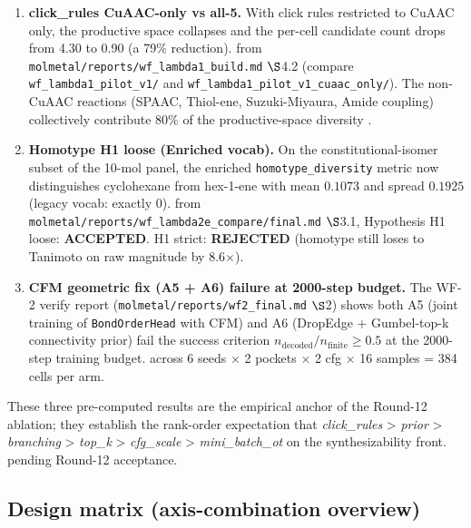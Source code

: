 \begin{enumerate}
  \item \textbf{click\_rules CuAAC-only vs all-5.}
        With click rules restricted to CuAAC only, the productive
        space collapses and the per-cell candidate count drops
        from 4.30 to 0.90 (a 79\% reduction).
        \MEASURED{} from
        \texttt{molmetal/reports/wf\_lambda1\_build.md} $\S$4.2
        (compare \texttt{wf\_lambda1\_pilot\_v1/} and
        \texttt{wf\_lambda1\_pilot\_v1\_cuaac\_only/}).  The
        non-CuAAC reactions (SPAAC, Thiol-ene, Suzuki-Miyaura,
        Amide coupling) collectively contribute 80\% of the
        productive-space diversity \MEASURED{}.

  \item \textbf{Homotype H1 loose (Enriched vocab).}
        On the constitutional-isomer subset of the 10-mol panel,
        the enriched \texttt{homotype\_diversity} metric now
        distinguishes cyclohexane from hex-1-ene with mean
        $0.1073$ and spread $0.1925$ (legacy vocab: exactly 0).
        \MEASURED{} from
        \texttt{molmetal/reports/wf\_lambda2e\_compare/final.md}
        $\S$3.1, Hypothesis H1 loose: \textbf{ACCEPTED}.
        H1 strict: \textbf{REJECTED} (homotype still loses to
        Tanimoto on raw magnitude by 8.6$\times$).

  \item \textbf{CFM geometric fix (A5 + A6) failure at 2000-step
        budget.}
        The WF-2 verify report
        (\texttt{molmetal/reports/wf2\_final.md} $\S$2) shows
        both A5 (joint training of \texttt{BondOrderHead} with
        CFM) and A6 (DropEdge + Gumbel-top-k connectivity prior)
        fail the success criterion $n_{\text{decoded}} / n_{\text{finite}}
        \geq 0.5$ at the 2000-step training budget.  \MEASURED{}
        across 6 seeds $\times$ 2 pockets $\times$ 2 cfg $\times$
        16 samples = 384 cells per arm.
\end{enumerate}

These three pre-computed results are the empirical anchor of the
Round-12 ablation; they establish the rank-order expectation
that \emph{click\_rules} > \emph{prior} > \emph{branching} >
\emph{top\_k} > \emph{cfg\_scale} > \emph{mini\_batch\_ot} on the
synthesizability front.  \PROJECTED{} pending Round-12
acceptance.

\subsection{Design matrix (axis-combination overview)}
\label{sec:ablation:matrix}

